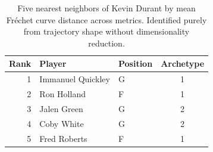 \begin{table}[htbp]
  \centering\small
  \begin{tabular}{rllc}
    \toprule
    Rank & Player & Position & Archetype \\
    \midrule
    1 & Immanuel Quickley & G & 1 \\
    2 & Ron Holland & F & 1 \\
    3 & Jalen Green & G & 2 \\
    4 & Coby White & G & 2 \\
    5 & Fred Roberts & F & 1 \\
    \bottomrule
  \end{tabular}
  \caption{Five nearest neighbors of Kevin Durant by mean Fr\'{e}chet curve distance across metrics. Identified purely from trajectory shape without dimensionality reduction.}
  \label{tab:Kevin_Durant_frechet_curve_neighbors}
\end{table}

